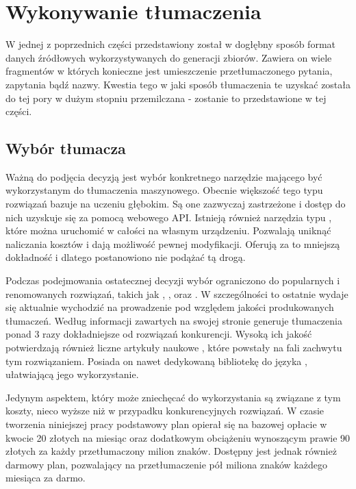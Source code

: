 \section{Wykonywanie tłumaczenia}
W jednej z poprzednich części przedstawiony został w dogłębny sposób format danych źródłowych wykorzystywanych do generacji zbiorów. Zawiera on wiele fragmentów w których konieczne jest umieszczenie przetłumaczonego pytania, zapytania bądź nazwy. Kwestia tego w jaki sposób tłumaczenia te uzyskać została do tej pory w dużym stopniu przemilczana - zostanie to przedstawione w tej części.

\subsection{Wybór tłumacza}
Ważną do podjęcia decyzją jest wybór konkretnego narzędzie mającego być wykorzystanym do tłumaczenia maszynowego. Obecnie większość tego typu rozwiązań bazuje na uczeniu głębokim. Są one zazwyczaj zastrzeżone i dostęp do nich uzyskuje się za pomocą webowego API. Istnieją również narzędzia typu , które można uruchomić w całości na własnym urządzeniu. Pozwalają uniknąć naliczania kosztów i dają możliwość pewnej modyfikacji. Oferują za to mniejszą dokładność i dlatego postanowiono nie podążać tą drogą.

Podczas podejmowania ostatecznej decyzji wybór ograniczono do popularnych i renomowanych rozwiązań, takich jak  \cite{google-translation-api},  \cite{microsoft-translator},  \cite{amazon-translator} oraz  \cite{deepl}. W szczególności to ostatnie wydaje się aktualnie wychodzić na prowadzenie pod względem jakości produkowanych tłumaczeń. Według informacji zawartych na swojej stronie  generuje tłumaczenia ponad 3 razy dokładniejsze od rozwiązań konkurencji. Wysoką ich jakość potwierdzają również liczne artykuły naukowe \cite{Yulianto2021}\cite{Ternero2021}\cite{Bahasa2023}, które powstały na fali zachwytu tym rozwiązaniem. Posiada on nawet dedykowaną bibliotekę do języka , ułatwiającą jego wykorzystanie. 

Jedynym aspektem, który może zniechęcać do wykorzystania  są związane z tym koszty, nieco wyższe niż w przypadku konkurencyjnych rozwiązań. W czasie tworzenia niniejszej pracy podstawowy plan opierał się na bazowej opłacie w kwocie 20 złotych na miesiąc oraz dodatkowym obciążeniu wynoszącym prawie 90 złotych za każdy przetłumaczony milion znaków. Dostępny jest jednak również darmowy plan, pozwalający na przetłumaczenie pół miliona znaków każdego miesiąca za darmo.

